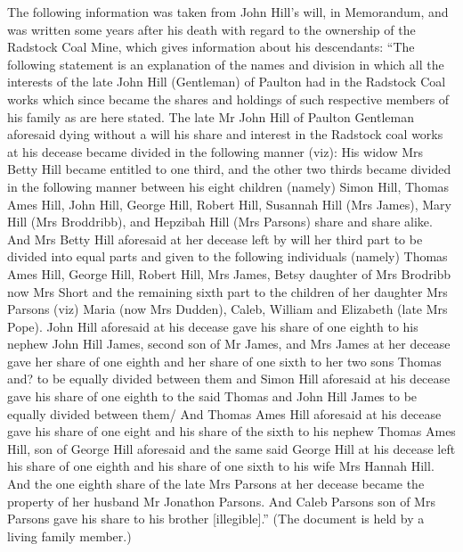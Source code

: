 The following information was taken from John Hill's will, in Memorandum, and was  written some years after his death with regard to the ownership of the Radstock Coal Mine, which gives information about his descendants: ``The following statement is an explanation of the names and division in which all the interests of the late John Hill (Gentleman) of Paulton had in the Radstock Coal works which since became the shares and holdings of such respective members of his family as are here stated. The late Mr John Hill of Paulton Gentleman aforesaid dying without a will his share and interest in the Radstock coal works at his decease became divided in the following manner (viz): His widow Mrs Betty Hill became entitled to one third, and the other two thirds became divided in the following manner between his eight children (namely) Simon Hill, Thomas Ames Hill, John Hill, George Hill, Robert Hill, Susannah Hill (Mrs James), Mary Hill (Mrs Broddribb), and Hepzibah Hill (Mrs Parsons) share and share alike. And Mrs Betty Hill aforesaid at her decease left by will her third part to be divided into equal parts and given to the following individuals (namely) Thomas Ames Hill, George Hill, Robert Hill, Mrs James, Betsy daughter of Mrs Brodribb now Mrs Short and the remaining sixth part to the children of her daughter Mrs Parsons (viz) Maria (now Mrs Dudden), Caleb, William and Elizabeth (late Mrs Pope). John Hill aforesaid at his decease gave his share of one eighth to his nephew John Hill James, second son of Mr James, and Mrs James at her decease gave her share of one eighth and her share of one sixth to her two sons Thomas and? to be equally divided between them and Simon Hill aforesaid at his decease gave his share of one eighth to the said Thomas and John Hill James to be equally divided between them/ And Thomas Ames Hill aforesaid at his decease gave his share of one eight and his share of the sixth to his nephew Thomas Ames Hill, son of George Hill aforesaid and the same said George Hill at his decease left his share of one eighth and his share of one sixth to his wife Mrs Hannah Hill. And the one eighth share of the late Mrs Parsons at her decease became the property of her husband Mr Jonathon Parsons. And Caleb Parsons son of Mrs Parsons gave his share to his brother [illegible].'' (The document is held by a living family member.)

